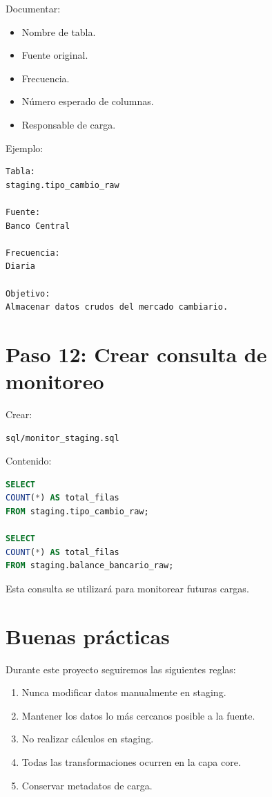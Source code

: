 Documentar:

\begin{itemize}
\item Nombre de tabla.
\item Fuente original.
\item Frecuencia.
\item Número esperado de columnas.
\item Responsable de carga.
\end{itemize}

Ejemplo:

\begin{verbatim}
Tabla:
staging.tipo_cambio_raw

Fuente:
Banco Central

Frecuencia:
Diaria

Objetivo:
Almacenar datos crudos del mercado cambiario.
\end{verbatim}

\section{Paso 12: Crear consulta de monitoreo}

Crear:

\begin{verbatim}
sql/monitor_staging.sql
\end{verbatim}

Contenido:

\begin{lstlisting}[language=SQL]
SELECT
COUNT(*) AS total_filas
FROM staging.tipo_cambio_raw;

SELECT
COUNT(*) AS total_filas
FROM staging.balance_bancario_raw;
\end{lstlisting}

Esta consulta se utilizará para monitorear futuras cargas.

\section{Buenas prácticas}

Durante este proyecto seguiremos las siguientes reglas:

\begin{enumerate}
\item Nunca modificar datos manualmente en staging.
\item Mantener los datos lo más cercanos posible a la fuente.
\item No realizar cálculos en staging.
\item Todas las transformaciones ocurren en la capa core.
\item Conservar metadatos de carga.
\end{enumerate}

